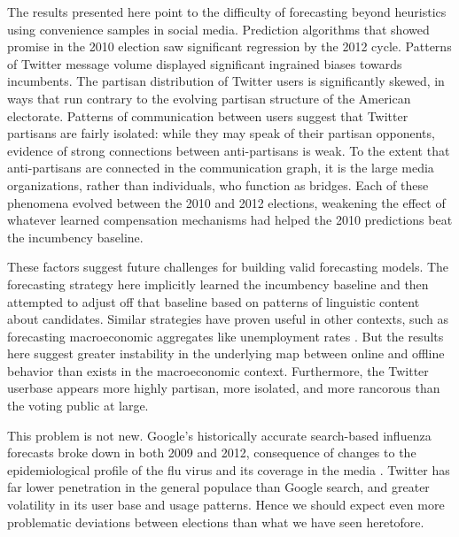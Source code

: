 \documentclass{article}
\begin{document}
The results presented here point to the difficulty of forecasting
beyond heuristics using convenience samples in social
media. Prediction algorithms that showed promise in the 2010 election
saw significant regression by the 2012 cycle. Patterns of Twitter
message volume displayed significant ingrained biases towards
incumbents. The partisan distribution of Twitter users is
significantly skewed, in ways that run contrary to the evolving
partisan structure of the American electorate. Patterns of
communication between users suggest that Twitter partisans are fairly
isolated: while they may speak of their partisan opponents, evidence
of strong connections between anti-partisans is weak. To the extent
that anti-partisans are connected in the communication graph, it is
the large media organizations, rather than individuals, who function
as bridges. Each of these phenomena evolved between the 2010
and 2012 elections, weakening the effect of whatever learned
compensation mechanisms had helped the 2010 predictions beat the
incumbency baseline. 

These factors suggest future challenges for building valid forecasting
models. The forecasting strategy here implicitly learned the
incumbency baseline and then attempted to adjust off that baseline
based on patterns of linguistic content about candidates. Similar
strategies have proven useful in other contexts, such as forecasting
macroeconomic aggregates like unemployment rates
\cite{choi2012predicting}. But the results here suggest greater
instability in the underlying map between online and offline behavior
than exists in the macroeconomic context. Furthermore, the Twitter
userbase appears more highly partisan, more isolated, and more
rancorous than the voting public at large. 

This problem is not new. Google's historically accurate search-based
influenza forecasts \citep{ginsberg2008detecting} broke down in both
2009 and 2012, consequence of changes to the epidemiological profile
of the flu virus and its coverage in the media
\citep{butler2013google,41763}. Twitter has far lower penetration in
the general populace than Google search, and greater volatility in its
user base and usage patterns. Hence we should expect even more
problematic deviations between elections than what we have seen
heretofore.

\end{document}
